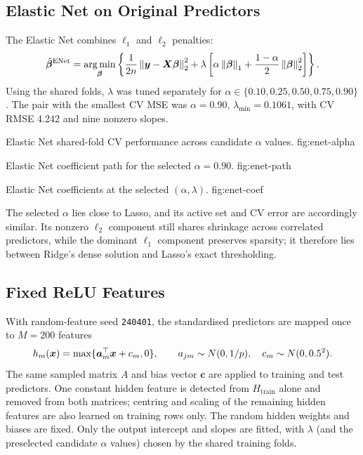 \subsection{Elastic Net on Original Predictors}
\label{sec:enet-original}

The Elastic Net \citep{ZouHastie2005} combines $\ell_1$ and $\ell_2$ penalties:
\[
 \hat{\bm{\beta}}^{\mathrm{ENet}}
 =\operatorname*{arg\,min}_{\bm{\beta}}\left\{
 \frac{1}{2n}\left\lVert \bm{y}-\bm{X}\bm{\beta} \right\rVert_2^2
 +\lambda\left[\alpha\left\lVert \bm{\beta} \right\rVert_1
 +\frac{1-\alpha}{2}\left\lVert \bm{\beta} \right\rVert_2^2\right]\right\}.
\]
Using the shared folds, $\lambda$ was tuned separately for
$\alpha\in\{0.10,0.25,0.50,0.75,0.90\}$.  The pair with the smallest CV MSE
was $\alpha=0.90$, $\lambda_{\min}=0.1061$, with CV RMSE 4.242 and nine
nonzero slopes.

%
  {Elastic Net shared-fold CV performance across candidate $\alpha$ values.}%
  {fig:enet-alpha}

%
  {Elastic Net coefficient path for the selected $\alpha=0.90$.}%
  {fig:enet-path}

%
  {Elastic Net coefficients at the selected $(\alpha,\lambda)$.}%
  {fig:enet-coef}




The selected $\alpha$ lies close to Lasso, and its active set and CV error are
accordingly similar.  Its nonzero $\ell_2$ component still shares shrinkage
across correlated predictors, while the dominant $\ell_1$ component preserves
sparsity; it therefore lies between Ridge's dense solution and Lasso's exact
thresholding.

\subsection{Fixed ReLU Features}
\label{sec:relu-features}

With random-feature seed \texttt{240401}, the standardised predictors are
mapped once to $M=200$ features
\[
 h_m(\bm{x})=\max\{\bm a_m^\top\bm{x}+c_m,0\},\qquad
 a_{jm}\sim N(0,1/p),\quad c_m\sim N(0,0.5^2).
\]
The same sampled matrix $A$ and bias vector $\bm c$ are applied to training and
test predictors.  One constant hidden feature is detected from $H_{\mathrm{train}}$
alone and removed from both matrices; centring and scaling of the remaining
hidden features are also learned on training rows only.  The random hidden
weights and biases are fixed.  Only the output intercept and slopes are fitted,
with $\lambda$ (and the preselected candidate $\alpha$ values) chosen by the
shared training folds.


